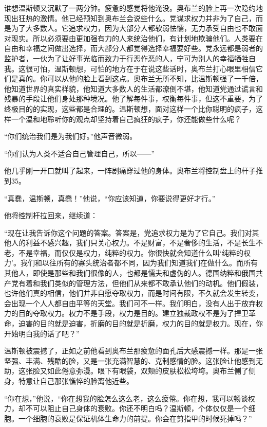 谁想温斯顿又沉默了一两分钟。疲惫的感觉将他淹没。奥布兰的脸上再一次隐约地现出狂热的激情。他已经预知到奥布兰会说些什么。党谋求权力并非为了自己，而是为了大多数人。它追求权力，因为大部分人都软弱怯懦，无力承受自由也不敢面对现实。所以必须要由更加强有力的人来统治他们，有计划地欺骗他们。人类要在自由和幸福之间做出选择，而大部分人都觉得选择幸福要好些。党永远都是弱者的监护者，一伙为了让好事光临而致力于行恶作恶的人，宁可为别人的幸福牺牲自我。这很可怕，温斯顿想，可怕的地方在于在说这些话时，奥布兰打心眼里相信它们是真的。你可以从他的脸上看到这点。奥布兰无所不知，比温斯顿强了一千倍，他知道世界的真实样貌，他知道大多数人的生活都潦倒不堪，他知道党通过谎言和残暴的手段让他们身处那种境况。他了解每件事，权衡每件事，但这不重要，为了终极目的的实现，这些都是合理的。温斯顿想，面对这样一个比你聪明的疯子，这样一个温和地聆听你的观点却坚持着自己疯狂的疯子，你还能做些什么呢？

``你们统治我们是为我们好。''他声音微弱。

``你们认为人类不适合自己管理自己，所以——''

他几乎刚一开口就叫了起来，一阵剧痛穿过他的身体。奥布兰将控制盘上的杆子推到35。

``真蠢，温斯顿，真蠢！''他说，``你应该知道，你要说得更好才行。''

他将控制杆拉回来，继续道：

``现在让我告诉你这个问题的答案。答案是，党追求权力是为了它自己。我们对其他人的利益不感兴趣，我们只关心权力。不是财富，不是奢侈的生活，不是长生不老，不是幸福，而仅仅是权力，纯粹的权力。你很快就会知道什么叫`纯粹的权力'。我们和以往所有的寡头统治者都不同，因为我们知道我们在做什么。而所有其他人，即使是那些和我们很像的人，也都是懦夫和虚伪的人。德国纳粹和俄国共产党有着和我们类似的管理方法，但他们从来都不敢承认他们的动机。他们假装，也许他们真的相信，他们并非自愿夺取权力，而是时间有限，不久就会发生转变，会出现一个人人都自由平等的天堂。我们可不一样。我们明白，没有人出于放弃权力的目的夺取权力。权力不是手段，权力是目的。建立独裁政权不是为了捍卫革命，迫害的目的就是迫害，折磨的目的就是折磨，权力的目的就是权力。现在，你开始明白我的话了吧？''

温斯顿被震撼了，正如之前他看到奥布兰那疲惫的面孔后大感震撼一样。那是一张坚强、丰满、残酷的脸，又是一张充满智慧的、克制感情的脸。这张脸让他感到无助，这张脸又如此倦意弥漫。眼下有眼袋，双颊的皮肤松松垮垮。奥布兰侧了侧身，特意让自己那张憔悴的脸离他近些。

``你在想，''他说，``你在想我的脸怎么这么老，这么疲倦。你在想，我可以畅谈权力，却不可以阻止自己身体的衰败。你还不明白吗？温斯顿，个体仅仅是一个细胞。一个细胞的衰败是保证机体生命力的前提。你会在剪指甲的时候死掉吗？''

